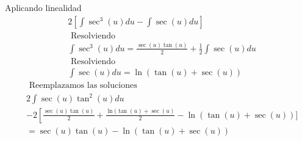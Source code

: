 Aplicando linealidad
$$
\begin{aligned}
& 2\left[\int \sec ^3(u) d u-\int \sec (u) d u\right] \\
& \text { Resolviendo } \\
& \int \sec ^3(u) d u= \frac{\sec (u) \tan (u)}{2}+\frac{1}{2} \int \sec (u) d u \\
& \text { Resolviendo } \\
& \int \sec (u) d u=\ln (\tan (u)+\sec (u))
\end{aligned}
$$
$$
\begin{aligned}
& \text { Reemplazamos las soluciones } \\
& 2 \int \sec (u) \tan ^2(u) d u \\
& -2\left[\frac{\sec (u) \tan (u)}{2}+\frac{\ln (\tan (u)+\sec (u)}{2}-\ln (\tan (u)+\sec (u))]\right. \\
& =\sec (u) \tan (u)-\ln (\tan ( u)+\sec (u))
\end{aligned}
$$

